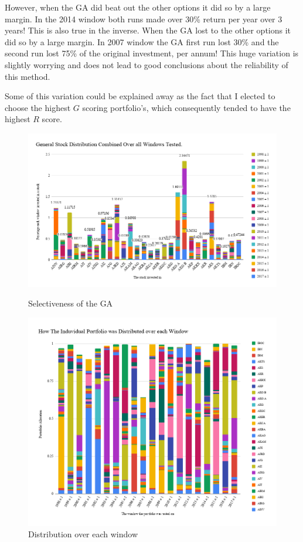 \documentclass[11pt]{article}
\begin{document}
    However, when the GA did beat out the other options it did so by a large margin. In
    the 2014 window both runs made over 30\% return per year over 3 years! This is also true
    in the inverse. When the GA lost to the other options it did so by a large margin.
    In 2007 window the GA first run lost 30\% and the second run
    lost 75\% of the original investment, per annum! This huge variation is slightly worrying
    and does not lead to good conclusions about the reliability of this method.

    Some of this variation could be explained away as the fact that I elected to choose the
    highest \(G\) scoring portfolio's, which consequently tended to have the highest \(R\)
    score.

    \begin{figure}[H] %
        \centering
        \includegraphics[width=\textwidth - 1in]{GeneralStockDistributionCombinedOverAllWindowsTested}
        \caption{Selectiveness of the GA}
            \label{fig:GeneralStockDistributionCombinedOverAllWindowsTested}
        \includegraphics[width=\textwidth - 1in]{HowTheInduvidualPortfolioWasDistributedOverEachWindow}
        \caption{Distribution over each window}
            \label{fig:HowTheInduvidualPortfolioWasDistributedOverEachWindow}
    \end{figure}
\end{document}
